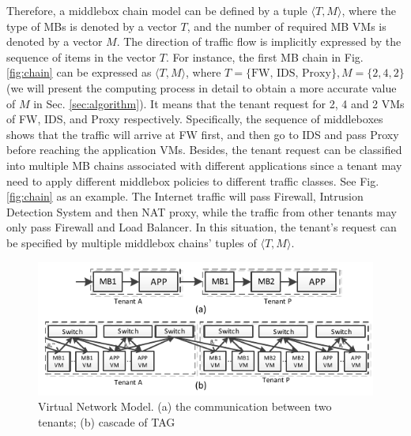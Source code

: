 \documentclass[review]{elsarticle}
\begin{document}
Therefore, a middlebox chain model can be defined by a tuple $\langle T, M \rangle$, where the type of MBs is denoted by a vector $T$, and the number of required MB VMs is denoted by a vector $M$. The direction of traffic flow is implicitly expressed by the sequence of items in the vector $T$. For instance, the first MB chain in Fig. \ref{fig:chain} can be expressed as $\langle T, M \rangle$, where $T=\{\text{FW, IDS, Proxy}\}, M=\{2, 4, 2\}$ (we will present the computing process in detail to obtain a more accurate value of $M$ in Sec. \ref{sec:algorithm}). It means that the tenant request for 2, 4 and 2 VMs of FW, IDS, and Proxy respectively. Specifically, the sequence of middleboxes shows that the traffic will arrive at FW first, and then go to IDS and pass Proxy before reaching the application VMs. Besides, the tenant request can be classified into multiple MB chains associated with different applications \cite{stratos12, M14sap, nfv_challenges} since a tenant may need to apply different middlebox policies to different traffic classes. See Fig. \ref{fig:chain} as an example. The Internet traffic will pass Firewall, Intrusion Detection System and then NAT proxy, while the traffic from other tenants may only pass Firewall and Load Balancer. In this situation, the tenant's request can be specified by multiple middlebox chains' tuples of $\langle T, M \rangle$.
\begin{figure}
	\centering
	\includegraphics[width=4.5 in]{fig/abstraction.pdf}
	\caption{Virtual Network Model. (a) the communication between two tenants; (b) cascade of TAG}
	\label{fig:abstraction}
\end{figure}
\end{document}
